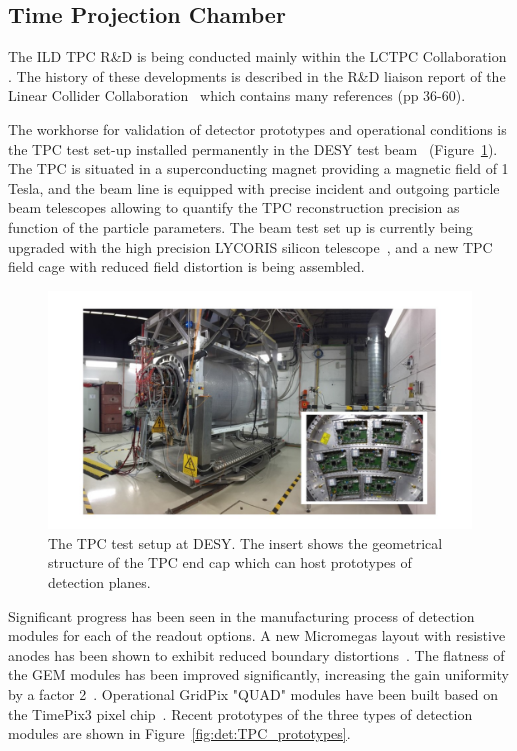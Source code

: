 \subsection{Time Projection Chamber}

The ILD TPC R\&D is being conducted mainly within the LCTPC Collaboration \cite{ild:bib:TPC_lctpc}. The history of these developments is described in the R\&D liaison report of the Linear Collider Collaboration~\cite{ild:bib:TPC_liaison} which contains many references (pp 36-60).

The workhorse for validation of detector prototypes and operational conditions is the TPC test set-up installed permanently in the DESY test beam~\cite{ild:bib:TPC_desytb} (Figure~\ref{fig:det:TPC_test_setup}). The TPC is situated in a superconducting magnet providing a magnetic field of 1 Tesla, and the beam line is equipped with precise incident and outgoing particle beam telescopes allowing to quantify the TPC reconstruction precision as function of the particle parameters. The beam test set up is currently being upgraded with the high precision LYCORIS silicon telescope~\cite{ild:bib:TPC_lycoris}, and a new TPC field cage with reduced field distortion is being assembled.

\begin{figure}[t!]
\centering
\includegraphics[width=1.0\hsize]{Detector/fig/TPC_test_setup.jpg}
\caption{The TPC test setup at DESY. The insert shows the geometrical structure of the TPC end cap which can host prototypes of detection planes.}
\label{fig:det:TPC_test_setup}
\end{figure}

Significant progress has been seen in the manufacturing process of detection modules for each of the readout options. A new Micromegas layout with resistive anodes has been shown to exhibit reduced boundary distortions~\cite{ild:bib:TPC_distortions}. The flatness of the GEM modules has been improved significantly, increasing the gain uniformity by a factor 2~\cite{ild:bib:TPC_GEMflatness}. Operational GridPix "QUAD" modules have been built based on the TimePix3 pixel chip~\cite{ild:bib:TPC_quad}. Recent prototypes of the three types of detection modules are shown in Figure~\ref{fig:det:TPC_prototypes}.  

